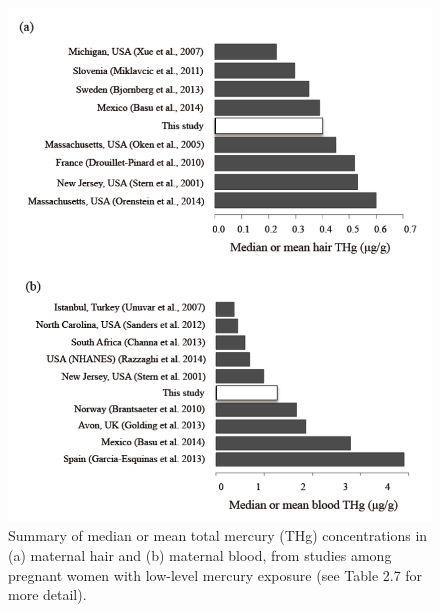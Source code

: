 \begin{figure}
  \centering
    \label{fig:Fig217}
  \includegraphics[scale=1]{Figures/Fig217.pdf}
  \caption[Summary of median or mean total mercury concentrations in (a) maternal hair and (b) maternal blood, from studies among pregnant women with low-level mercury exposure]{Summary of median or mean total mercury (THg) concentrations in (a) maternal hair and (b) maternal blood, from studies among pregnant women with low-level mercury exposure (see Table 2.7 for more detail).}
\end{figure}

